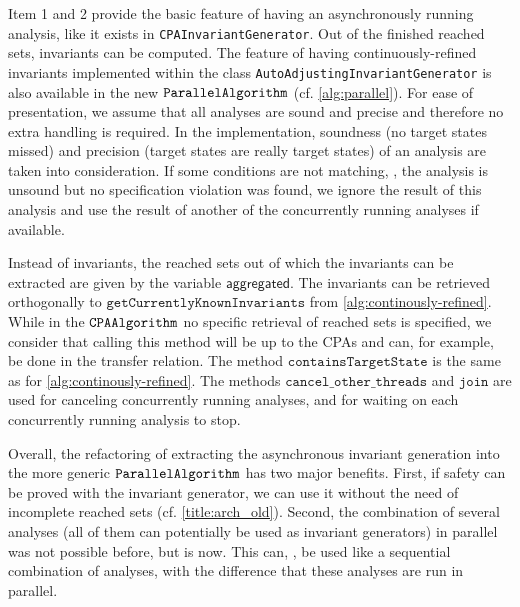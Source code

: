 Item 1 and 2 provide the basic feature of having an asynchronously running analysis, like it exists in \texttt{CPAInvariantGenerator}. Out of the finished reached sets, invariants can be 
computed. The feature of having continuously-refined invariants implemented within the class \texttt{AutoAdjustingInvariantGenerator} is also available in the new $\mathtt{ParallelAlgorithm}{}$ 
(cf. \autoref{alg:parallel}). For ease of presentation, we assume that all analyses are sound and precise and therefore no extra handling is required. In the implementation, soundness (no 
target states missed) and precision (target states are really target states) of an analysis are taken into consideration. If some conditions are not matching, \eg, the analysis is unsound 
but no specification violation was found, we ignore the result of this analysis and use the result of another of the concurrently running analyses if available.

Instead of invariants, the reached sets out of which the invariants can be extracted are given by the variable  $\mathsf{aggregated}$. The invariants can be retrieved orthogonally to 
$\mathtt{getCurrentlyKnownInvariants}$ from \autoref{alg:continously-refined}. While in the $\mathtt{CPAAlgorithm}{}$ no specific retrieval of reached sets is specified, we consider 
that calling this method will be up to the \acp{CPA} and can, for example, be done in the transfer relation. The method $\mathtt{containsTargetState}$ is the same as for \autoref{alg:continously-refined}. The 
methods $\mathtt{cancel\_other\_threads}$ and $\mathtt{join}$ are used for canceling concurrently running analyses, and for waiting on each concurrently running analysis to stop.

Overall, the refactoring of extracting the asynchronous invariant generation into the more generic $\mathtt{ParallelAlgorithm}{}$ has two major benefits. First, if safety can be proved with the 
invariant generator, we can use it without the need of incomplete reached sets (cf. \autoref{title:arch_old}). Second, the combination of several analyses (all of them can potentially be used 
as invariant generators) in parallel was not possible before, but is now. This can, \eg, be used like a sequential combination of analyses, with the difference that these 
analyses are run in parallel. 

\clearpage
